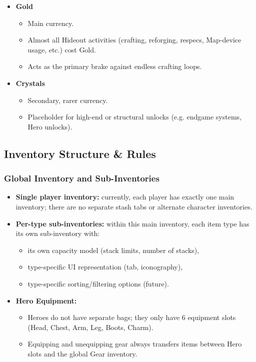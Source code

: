 \begin{itemize}
	\item \textbf{Gold}
	\begin{itemize}
		\item Main currency.
		\item Almost all Hideout activities (crafting, reforging, respecs, Map-device usage, etc.) cost Gold.
		\item Acts as the primary brake against endless crafting loops.
	\end{itemize}
	\item \textbf{Crystals}
	\begin{itemize}
		\item Secondary, rarer currency.
		\item Placeholder for high-end or structural unlocks (e.g. endgame systems, Hero unlocks).
	\end{itemize}
\end{itemize}


\subsection{Inventory Structure \& Rules}

\subsubsection*{Global Inventory and Sub-Inventories}

\begin{itemize}
	\item \textbf{Single player inventory:} currently, each player has exactly one main inventory; there are no separate stash tabs or alternate character inventories.
	\item \textbf{Per-type sub-inventories:} within this main inventory, each item type has its own sub-inventory with:
	\begin{itemize}
		\item its own capacity model (stack limits, number of stacks),
		\item type-specific UI representation (tab, iconography),
		\item type-specific sorting/filtering options (future).
	\end{itemize}
	\item \textbf{Hero Equipment:} 
	\begin{itemize}
		\item Heroes do not have separate bags; they only have 6 equipment slots (Head, Chest, Arm, Leg, Boots, Charm).
		\item Equipping and unequipping gear always transfers items between Hero slots and the global Gear inventory.
	\end{itemize}
\end{itemize}


